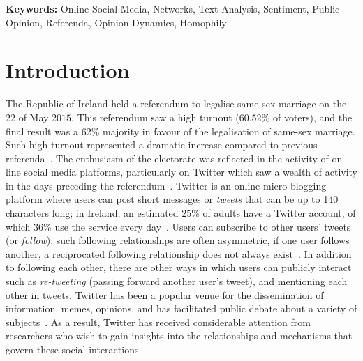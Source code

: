 \documentclass{article}
\begin{document}
{\small {\bf{Keywords:}} Online Social Media, Networks, Text
  Analysis, Sentiment, Public Opinion, Referenda, Opinion
  Dynamics, Homophily}




\section{Introduction}\label{sec:intro}

The Republic of Ireland held a referendum to legalise same-sex
marriage on the $22$ of May $2015$. This referendum saw a high turnout
(60.52\% of voters), and the final result was a 62\% majority in
favour of the legalisation of same-sex marriage.  Such high turnout
represented a dramatic increase compared to previous
referenda~\cite{MarieVoterTurnout2015}. The enthusiasm of the
electorate was reflected in the activity of on-line social media
platforms, particularly on Twitter which saw a wealth of activity in
the days preceding the referendum~\cite{RTEMarrefLeadingTopic2015}.
Twitter is an online micro-blogging platform where users can post
short messages or {\it tweets} that can be up to 140 characters long;
in Ireland, an estimated $25$\% of adults have a Twitter account, of
which $36\%$ use the service every day~\cite{CraigTwittersWoes2016}.
Users can subscribe to other users' tweets (or {\it follow}); such
following relationships are often asymmetric, if one user follows
another, a reciprocated following relationship does not always
exist~\cite{kwak2010twitterSocNetOrNews}.  In addition to following
each other, there are other ways in which users can publicly interact
such as {\it re-tweeting} (passing forward another user's tweet), and
mentioning each other in tweets.  Twitter has been a popular venue for
the dissemination of information, memes, opinions, and has facilitated
public debate about a variety of subjects~\cite{Gleeson2014,
  Beguerisse2014, Beguerisse2017, alvarez2015sentiment,
  tumasjan2010predicting, metaxas2011not,
  kwak2010twitterSocNetOrNews}. As a result, Twitter has received
considerable attention from researchers who wish to gain insights into
the relationships and mechanisms that govern these social
interactions~\cite{TahaBisedReview2016}.
\end{document}
